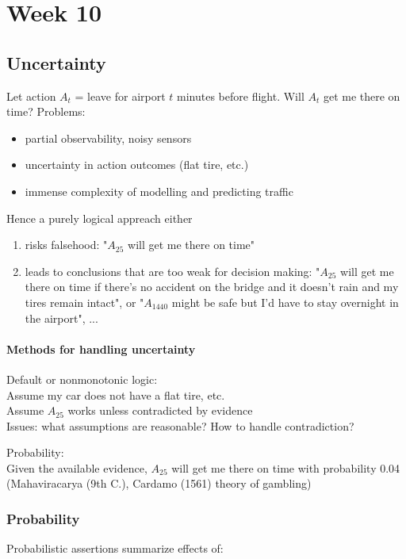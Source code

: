 \part{Week 10}
\chapter{Uncertainty}
Let action $A_t$ = leave for airport $t$ minutes before flight. Will $A_t$ get
me there on time? Problems:

\begin{itemize}
    \item partial observability, noisy sensors
    \item uncertainty in action outcomes (flat tire, etc.)
    \item immense complexity of modelling and predicting traffic
\end{itemize}

Hence a purely logical appreach either

\begin{enumerate}
    \item risks falsehood: "$A_{25}$ will get me there on time"
    \item leads to conclusions that are too weak for decision making: "$A_{25}$
        will get me there on time if there's no accident on the bridge and it
        doesn't rain and my tires remain intact", or "$A_{1440}$ might be safe
        but I'd have to stay overnight in the airport", ...
\end{enumerate}

\subsection{Methods for handling uncertainty}
Default or nonmonotonic logic:\\
Assume my car does not have a flat tire, etc.\\
Assume $A_{25}$ works unless contradicted by evidence\\
Issues: what assumptions are reasonable? How to handle contradiction?

Probability:\\
Given the available evidence, $A_{25}$ will get me there on time with
probability 0.04 (Mahaviracarya (9th C.), Cardamo (1561) theory of gambling)

\section{Probability}
Probabilistic assertions summarize effects of:

